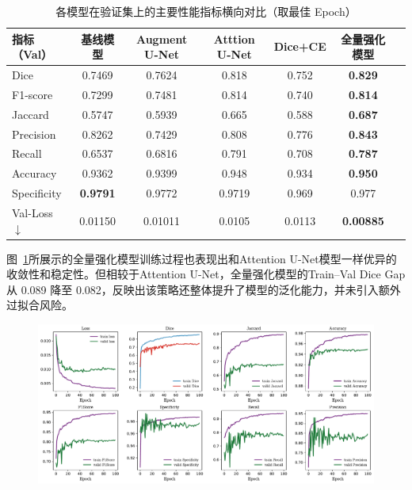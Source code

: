 \begin{table}[htbp]
    \centering
    \caption{各模型在验证集上的主要性能指标横向对比（取最佳 Epoch）}
    \label{tab:model_summary}
    \begin{tabular}{lcccccc}
        \toprule
        指标（Val） & 基线模型 & Augment U-Net & Atttion U-Net & Dice+CE & 全量强化模型 \\
        \midrule
        Dice        & 0.7469 & 0.7624 & 0.818 & 0.752 & \textbf{0.829} \\
        F1-score    & 0.7299 & 0.7481 & 0.814 & 0.740 & \textbf{0.814} \\
        Jaccard     & 0.5747 & 0.5939 & 0.665 & 0.588 & \textbf{0.687} \\
        Precision   & 0.8262 & 0.7429 & 0.808 & 0.776 & \textbf{0.843} \\
        Recall      & 0.6537 & 0.6816 & 0.791 & 0.708 & \textbf{0.787} \\
        Accuracy    & 0.9362 & 0.9399 & 0.948 & 0.934 & \textbf{0.950} \\
        Specificity & \textbf{0.9791} & 0.9772 & 0.9719 & 0.969 & 0.977 \\
        Val-Loss $\downarrow$ & 0.01150 & 0.01011 & 0.0105 & 0.0113 & \textbf{0.00885} \\
        \bottomrule
    \end{tabular}
\end{table}

图~\ref{fig:all_in_is_art}所展示的全量强化模型训练过程也表现出和Attention U-Net模型一样优异的收敛性和稳定性。但相较于Attention U-Net，全量强化模型的Train–Val Dice Gap 从 0.089 降至 0.082，反映出该策略还整体提升了模型的泛化能力，并未引入额外过拟合风险。

\begin{figure}
    \centering
    \includegraphics[width=\textwidth]{fig/allin_unet_metrics.pdf}
    \caption{}
    \label{fig:all_in_is_art}
\end{figure}


